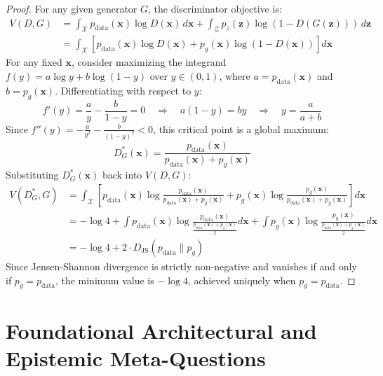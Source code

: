 \documentclass[11pt,a4paper]{article}
\theoremstyle{definition}
\begin{document}
\begin{proof}
For any given generator $G$, the discriminator objective is:
{\boldmath
\begin{align}
V(D, G) &= \int_{\mathcal{X}} p_{\text{data}}(\mathbf{x}) \log D(\mathbf{x}) \, d\mathbf{x} + \int_{\mathcal{Z}} p_z(\mathbf{z}) \log(1 - D(G(\mathbf{z}))) \, d\mathbf{z} \\
&= \int_{\mathcal{X}} \left[ p_{\text{data}}(\mathbf{x}) \log D(\mathbf{x}) + p_g(\mathbf{x}) \log(1 - D(\mathbf{x})) \right] d\mathbf{x}
\end{align}
}
For any fixed $\mathbf{x}$, consider maximizing the integrand $f(y) = a \log y + b \log(1 - y)$ over $y \in (0, 1)$, where $a = p_{\text{data}}(\mathbf{x})$ and $b = p_g(\mathbf{x})$. Differentiating with respect to $y$:
{\boldmath
\begin{equation}
f'(y) = \frac{a}{y} - \frac{b}{1 - y} = 0 \quad \Longrightarrow \quad a(1 - y) = b y \quad \Longrightarrow \quad y = \frac{a}{a + b}
\end{equation}
}
Since $f''(y) = -\frac{a}{y^2} - \frac{b}{(1 - y)^2} < 0$, this critical point is a global maximum:
{\boldmath
\begin{equation}
D^*_G(\mathbf{x}) = \frac{p_{\text{data}}(\mathbf{x})}{p_{\text{data}}(\mathbf{x}) + p_g(\mathbf{x})}
\end{equation}
}
Substituting $D^*_G(\mathbf{x})$ back into $V(D, G)$:
{\boldmath
\begin{align}
V(D^*_G, G) &= \int_{\mathcal{X}} \left[ p_{\text{data}}(\mathbf{x}) \log \frac{p_{\text{data}}(\mathbf{x})}{p_{\text{data}}(\mathbf{x}) + p_g(\mathbf{x})} + p_g(\mathbf{x}) \log \frac{p_g(\mathbf{x})}{p_{\text{data}}(\mathbf{x}) + p_g(\mathbf{x})} \right] d\mathbf{x} \\
&= -\log 4 + \int p_{\text{data}}(\mathbf{x}) \log \frac{p_{\text{data}}(\mathbf{x})}{\frac{p_{\text{data}}(\mathbf{x}) + p_g(\mathbf{x})}{2}} d\mathbf{x} + \int p_g(\mathbf{x}) \log \frac{p_g(\mathbf{x})}{\frac{p_{\text{data}}(\mathbf{x}) + p_g(\mathbf{x})}{2}} d\mathbf{x} \\
&= -\log 4 + 2 \cdot D_{\text{JS}}(p_{\text{data}} \parallel p_g)
\end{align}
}
Since Jensen-Shannon divergence is strictly non-negative and vanishes if and only if $p_g = p_{\text{data}}$, the minimum value is $-\log 4$, achieved uniquely when $p_g = p_{\text{data}}$.
\end{proof}

\section{Foundational Architectural and Epistemic Meta-Questions}
\end{document}

